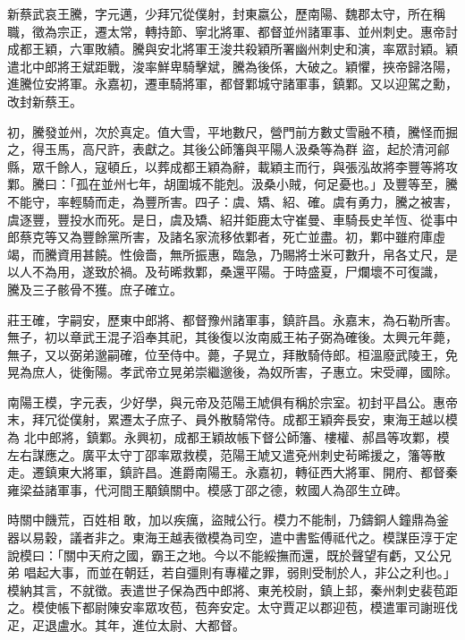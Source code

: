 \begin{pinyinscope}
 新蔡武哀王騰，字元邁，少拜冗從僕射，封東嬴公，歷南陽、魏郡太守，所在稱職，徵為宗正，遷太常，轉持節、寧北將軍、都督並州諸軍事、並州刺史。惠帝討成都王穎，六軍敗績。騰與安北將軍王浚共殺穎所署幽州刺史和演，率眾討穎。穎遣北中郎將王斌距戰，浚率鮮卑騎擊斌，騰為後係，大破之。穎懼，挾帝歸洛陽，進騰位安將軍。永嘉初，遷車騎將軍，都督鄴城守諸軍事，鎮鄴。又以迎駕之勳，改封新蔡王。



 初，騰發並州，次於真定。值大雪，平地數尺，營門前方數丈雪融不積，騰怪而掘之，得玉馬，高尺許，表獻之。其後公師籓與平陽人汲桑等為群
 盜，起於清河鄃縣，眾千餘人，寇頓丘，以葬成都王穎為辭，載穎主而行，與張泓故將李豐等將攻鄴。騰曰：「孤在並州七年，胡圍城不能剋。汲桑小賊，何足憂也。」及豐等至，騰不能守，率輕騎而走，為豐所害。四子：虞、矯、紹、確。虞有勇力，騰之被害，虞逐豐，豐投水而死。是日，虞及矯、紹并鉅鹿太守崔曼、車騎長史羊恆、從事中郎蔡克等又為豐餘黨所害，及諸名家流移依鄴者，死亡並盡。初，鄴中雖府庫虛竭，而騰資用甚饒。性儉嗇，無所振惠，臨急，乃賜將士米可數升，帛各丈尺，是以人不為用，遂致於禍。及茍晞救鄴，桑還平陽。于時盛夏，尸爛壞不可復識，
 騰及三子骸骨不獲。庶子確立。



 莊王確，字嗣安，歷東中郎將、都督豫州諸軍事，鎮許昌。永嘉末，為石勒所害。無子，初以章武王混子滔奉其祀，其後復以汝南威王祐子弼為確後。太興元年薨，無子，又以弼弟邈嗣確，位至侍中。薨，子晃立，拜散騎侍郎。桓溫廢武陵王，免晃為庶人，徙衡陽。孝武帝立晃弟崇繼邈後，為奴所害，子惠立。宋受禪，國除。



 南陽王模，字元表，少好學，與元帝及范陽王虓俱有稱於宗室。初封平昌公。惠帝末，拜冗從僕射，累遷太子庶子、員外散騎常侍。成都王穎奔長安，東海王越以模為
 北中郎將，鎮鄴。永興初，成都王穎故帳下督公師籓、樓權、郝昌等攻鄴，模左右謀應之。廣平太守丁邵率眾救模，范陽王虓又遣兗州刺史茍晞援之，籓等散走。遷鎮東大將軍，鎮許昌。進爵南陽王。永嘉初，轉征西大將軍、開府、都督秦雍梁益諸軍事，代河間王顒鎮關中。模感丁邵之德，敕國人為邵生立碑。



 時關中饑荒，百姓相敢，加以疾癘，盜賊公行。模力不能制，乃鑄銅人鐘鼎為釜器以易穀，議者非之。東海王越表徵模為司空，遣中書監傅祗代之。模謀臣淳于定說模曰：「關中天府之國，霸王之地。今以不能綏撫而還，既於聲望有虧，又公兄弟
 唱起大事，而並在朝廷，若自彊則有專權之罪，弱則受制於人，非公之利也。」模納其言，不就徵。表遣世子保為西中郎將、東羌校尉，鎮上邽，秦州刺史裴苞距之。模使帳下都尉陳安率眾攻苞，苞奔安定。太守賈疋以郡迎苞，模遣軍司謝班伐疋，疋退盧水。其年，進位太尉、大都督。




\end{pinyinscope}
